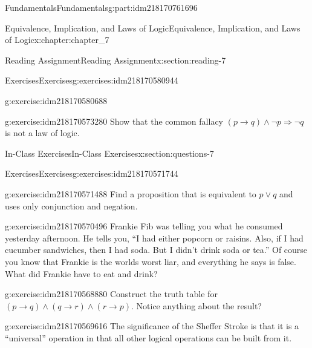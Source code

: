 \documentclass[oneside,10pt,]{book}
\numberwithin{equation}{section}
\begin{document}
\begin{partptx}{Fundamentals}{}{Fundamentals}{}{}{g:part:idm218170761696}
\begin{chapterptx}{Equivalence, Implication, and Laws of Logic}{}{Equivalence, Implication, and Laws of Logic}{}{}{x:chapter:chapter_7}
\begin{sectionptx}{Reading Assignment}{}{Reading Assignment}{}{}{x:section:reading-7}
\begin{exercises-subsection-numberless}{Exercises}{}{Exercises}{}{}{g:exercises:idm218170580944}
\begin{exercisegroup}
\begin{divisionexerciseeg}{1}{}{}{g:exercise:idm218170580688}
%
\end{divisionexerciseeg}%
\begin{divisionexerciseeg}{2}{}{}{g:exercise:idm218170573280}%
Show that the common fallacy \((p\to  q) \land  \neg p \Rightarrow  \neg q\) is not a law of logic.%
\end{divisionexerciseeg}%
\end{exercisegroup}
\par\medskip\noindent
\end{exercises-subsection-numberless}
\end{sectionptx}
%
%
\typeout{************************************************}
\typeout{************************************************}
%
\begin{sectionptx}{In-Class Exercises}{}{In-Class Exercises}{}{}{x:section:questions-7}
%
%
%
\typeout{************************************************}
\typeout{************************************************}
%
\begin{exercises-subsection-numberless}{Exercises}{}{Exercises}{}{}{g:exercises:idm218170571744}
\par\medskip\noindent%
%
\begin{exercisegroup}
\begin{divisionexerciseeg}{1}{}{}{g:exercise:idm218170571488}%
Find a proposition that is equivalent to \(p \lor  q\) and uses only conjunction and negation.%
\end{divisionexerciseeg}%
\begin{divisionexerciseeg}{2}{}{}{g:exercise:idm218170570496}%
Frankie Fib was telling you what he consumed yesterday afternoon. He tells you, ``I had either popcorn or raisins. Also, if I had cucumber sandwiches, then I had soda. But I didn't drink soda or tea.'' Of course you know that Frankie is the worlds worst liar, and everything he says is false. What did Frankie have to eat and drink?%
\end{divisionexerciseeg}%
\begin{divisionexerciseeg}{3}{}{}{g:exercise:idm218170568880}%
Construct the truth table for \((p \rightarrow q) \land (q \rightarrow r) \land (r \rightarrow p)\).   Notice anything about the result?%
\end{divisionexerciseeg}%
\begin{divisionexerciseeg}{4}{}{}{g:exercise:idm218170569616}%
The significance of the Sheffer Stroke is that it is a ``universal'' operation in that all other logical operations can be built from it.%

\end{divisionexerciseeg}
\end{exercisegroup}
\end{exercises-subsection-numberless}
\end{sectionptx}
\end{chapterptx}
\end{partptx}
\end{document}
